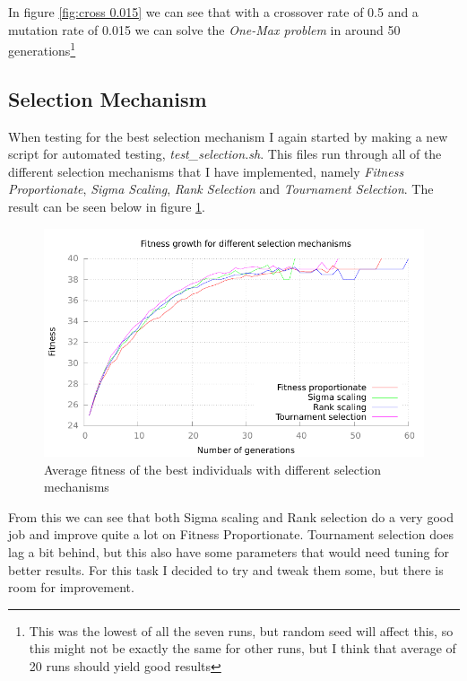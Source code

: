 In figure \ref{fig:cross 0.015} we can see that with a crossover rate of 0.5 and
a mutation rate of 0.015 we can solve the \textit{One-Max problem} in around 50
generations\footnote{This was the lowest of all the seven runs, but random seed
	will affect this, so this might not be exactly the same for other
runs, but I think that average of 20 runs should yield good results}

\subsection{Selection Mechanism}\label{sec:selection mechanism}
When testing for the best selection mechanism I again started by making a new
script for automated testing, \textit{test\_selection.sh}. This files run
through all of the different selection mechanisms that I have implemented,
namely \textit{Fitness Proportionate}, \textit{Sigma Scaling}, \textit{Rank
Selection} and \textit{Tournament Selection}. The result can be seen below in
figure \ref{fig:selection}.

\begin{figure}[h!]
	\includegraphics{../graphs/fitness_selection_average.pdf}
	\caption{Average fitness of the best individuals with different
	selection mechanisms}
	\label{fig:selection}
\end{figure}

From this we can see that both Sigma scaling and Rank selection do a very good
job and
improve quite a lot on Fitness Proportionate. Tournament selection does lag a
bit behind, but this also have some parameters that would need tuning for better
results. For this task I decided to try and tweak them some, but there is room for improvement.

